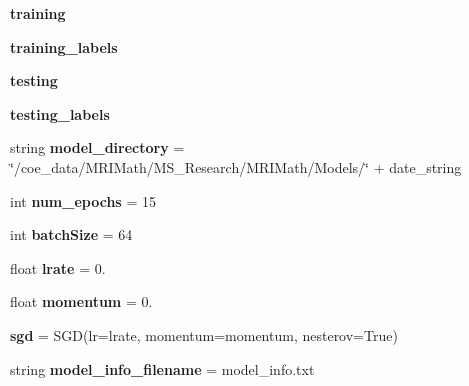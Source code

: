 \begin{DoxyCompactItemize}
\mbox{\label{namespaceTrainModels_a8026c2bd61636d5dd0f68fb1fdc6409a}} 
{\bfseries training}
\item 
\mbox{\label{namespaceTrainModels_aa04cd3ec8d1400d9e53b8c2c49df8a6c}} 
{\bfseries training\+\_\+labels}
\item 
\mbox{\label{namespaceTrainModels_a02724a94b2ba637116d11770cd857f56}} 
{\bfseries testing}
\item 
\mbox{\label{namespaceTrainModels_aa3f7691f033b85684585627bfb5d17ab}} 
{\bfseries testing\+\_\+labels}
\item 
\mbox{\label{namespaceTrainModels_a68c53c32db93051c59f945f9f327e3b2}} 
string {\bfseries model\+\_\+directory} = \char`\"{}/coe\+\_\+data/M\+R\+I\+Math/M\+S\+\_\+\+Research/M\+R\+I\+Math/Models/\char`\"{} + date\+\_\+string
\item 
\mbox{\label{namespaceTrainModels_a9349cd5eefb6ab524a8508df379e0792}} 
int {\bfseries num\+\_\+epochs} = 15
\item 
\mbox{\label{namespaceTrainModels_a3f5079615ab0a2bf9a50c93ba1b684ce}} 
int {\bfseries batch\+Size} = 64
\item 
\mbox{\label{namespaceTrainModels_a1535ac81cb7ef7953ef866e5ecc1ff2a}} 
float {\bfseries lrate} = 0.
\item 
\mbox{\label{namespaceTrainModels_a5c99bdf4876f454d076e5668f2b00a5b}} 
float {\bfseries momentum} = 0.
\item 
\mbox{\label{namespaceTrainModels_aec58316f9aabc285d97d5d6df2786620}} 
{\bfseries sgd} = S\+GD(lr=lrate, momentum=momentum, nesterov=True)
\item 
\mbox{\label{namespaceTrainModels_a95d5fbbe706b20c173d648ed19ced95b}} 
string {\bfseries model\+\_\+info\+\_\+filename} = \textquotesingle{}model\+\_\+info.\+txt\textquotesingle{}
\item 

\end{DoxyCompactItemize}
